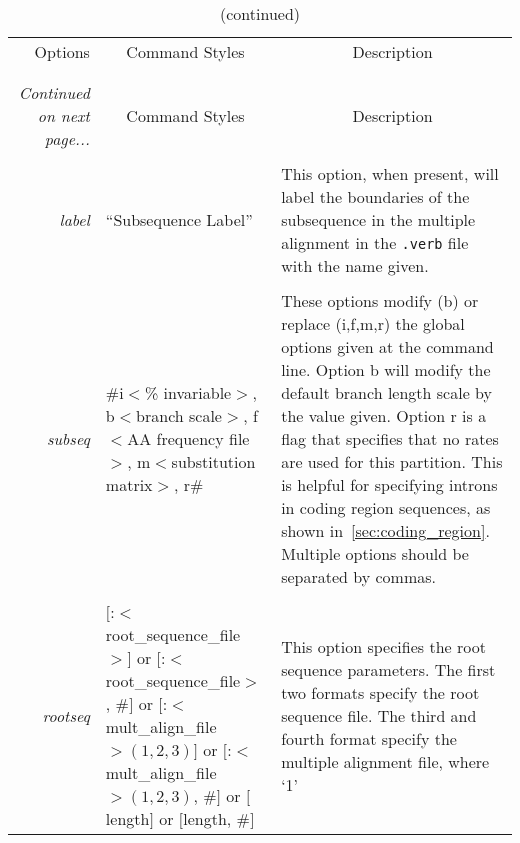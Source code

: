 \documentclass[10pt]{article}
\begin{document}
\begin{small}
\begin{longtable}{rp{5.5cm}p{7cm}}
\caption{{\normalsize Subsequence options.}}
\endfirsthead
\caption[]{{\normalsize (continued)}}\\
\hline 
\multicolumn{1}{|r}{{\normalsize Options}} & \multicolumn{1}{c}{{\normalsize Command Styles}} & \multicolumn{1}{c|}{\normalsize Description} \\
\hline
\\
\endhead
\hline\\
{\it \normalsize Continued on next page...}
\endfoot
\endlastfoot
\hline
\multicolumn{1}{|r}{\normalsize Options} & \multicolumn{1}{c}{\normalsize Command Styles} & \multicolumn{1}{c|}{\normalsize Description} \\
\hline
\\
{\it label}   & ``Subsequence Label'' & This option, when present, will label the 
boundaries of the subsequence in the multiple alignment in the {\tt *.verb} file with the name 
given. \\
\\
{\it subseq}  & \parbox[t]{5.4cm}{
  \#i$<$\% invariable$>$,\\
  b$<$branch scale$>$,\\
  f$<$AA frequency file$>$,\\
  m$<$substitution matrix$>$,\\
  r\#
} & These options modify (b) or replace (i,f,m,r) the global options given at the command 
line. Option b will modify the default branch length scale by the value given. Option r is a flag that specifies that no rates are used for this partition. This is helpful for specifying introns in coding region sequences, as shown in~\ref{sec:coding_region}. Multiple options should be separated by commas.\\
\\
{\it rootseq} & \parbox[t]{5.4cm}{
  $\mathtt{[}$:$<$root\_sequence\_file$>\mathtt{]}$ or \\
  $\mathtt{[}$:$<$root\_sequence\_file$>$, \#$\mathtt{]}$ or \\
  $\mathtt{[}$:$<$mult\_align\_file$>(1,2,3)\mathtt{]}$ or \\
  $\mathtt{[}$:$<$mult\_align\_file$>(1,2,3)$, \#$\mathtt{]}$ or \\
  $\mathtt{[}$length$\mathtt{]}$ or \\
  $\mathtt{[}$length, \#$\mathtt{]}$
} & This option specifies the root sequence parameters.  The first two formats specify 
the root sequence file. The third and fourth format specify the multiple alignment file, where `1' 

\end{longtable}
\end{small}
\end{document}

